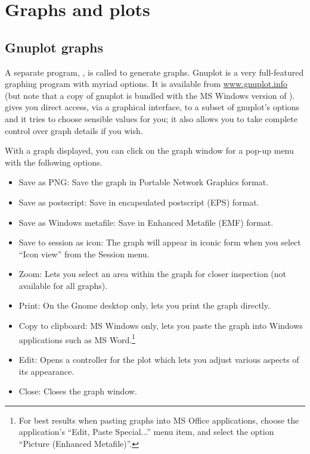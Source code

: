 \chapter{Graphs and plots}
\label{chap-graphs}

\section{Gnuplot graphs}
\label{gnuplot-graphs}

A separate program, , is called to generate graphs.
Gnuplot is a very full-featured graphing program with myriad options.
It is available from \href{http://www.gnuplot.info/}{www.gnuplot.info}
(but note that a copy of gnuplot is bundled with the MS Windows
version of ).   gives you direct access, via a
graphical interface, to a subset of gnuplot's options and it tries to
choose sensible values for you; it also allows you to take complete
control over graph details if you wish.

With a graph displayed, you can click on the graph window for a pop-up
menu with the following options.

\begin{itemize}
\item \textsf{Save as PNG}: Save the graph in Portable Network
  Graphics format.
\item \textsf{Save as postscript}: Save in encapsulated postscript
  (EPS) format.
\item \textsf{Save as Windows metafile}: Save in Enhanced Metafile
  (EMF) format.
\item \textsf{Save to session as icon}: The graph will appear in
  iconic form when you select ``Icon view'' from the Session menu.
\item \textsf{Zoom}: Lets you select an area within the graph for
  closer inspection (not available for all graphs).
\item \textsf{Print}: On the Gnome desktop only, lets you print the
  graph directly.
\item \textsf{Copy to clipboard}: MS Windows only, lets you paste the
  graph into Windows applications such as MS Word.\footnote{For best
    results when pasting graphs into MS Office applications, choose
    the application's ``Edit, Paste Special...'' menu item, and select
    the option ``Picture (Enhanced Metafile)''.}
\item \textsf{Edit}: Opens a controller for the plot which lets you
  adjust various aspects of its appearance.
\item \textsf{Close}: Closes the graph window.
\end{itemize}



